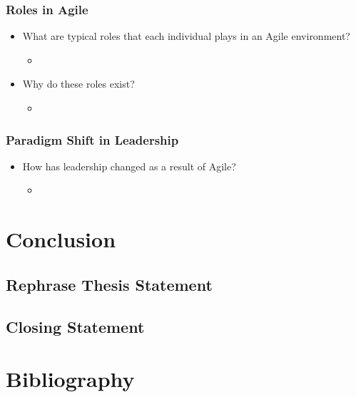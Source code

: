 \documentclass[11pt,a4paper]{article}
\begin{document}
		\subsubsection{Roles in Agile}
		\begin{itemize}[noitemsep]
			\item What are typical roles that each individual plays in an Agile environment?
			\begin{itemize}
				\item
			\end{itemize}
			\item Why do these roles exist?
			\begin{itemize}
				\item
			\end{itemize}
		\end{itemize}
		\subsubsection{Paradigm Shift in Leadership}
		\begin{itemize}[noitemsep]
			\item How has leadership changed as a result of Agile?
			\begin{itemize}
				\item
			\end{itemize}
		\end{itemize}

\section{Conclusion}
	\subsection{Rephrase Thesis Statement}
	\subsection{Closing Statement}

\newpage
\section{Bibliography}
\nocite{*}


\end{document}
